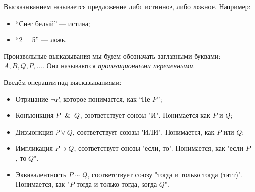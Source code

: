 \begin{definition}
	Высказыванием называется предложение либо истинное, либо ложное. Например:
	\begin{itemize}
		\item ``Снег белый'' --- истина;
		\item ``2  = 5'' --- ложь.
	\end{itemize}

	Произвольные высказывания мы будем обозначать заглавными буквами:
	$A, B, Q, P, \dots$. Они называются \emph{пропозиционными
		переменными}.
\end{definition}

Введём операции над высказываниями:
\begin{itemize}
	\item Отрицание $\neg P$, которое понимается, как ``Не $P$'';
	\item Конъюнкция $P \And Q$, соответствует союзы "И". Понимается
	      как $P$ и $Q$;
	\item  Дизъюнкция $P \vee Q$, соответствует союзы "ИЛИ".
	      Понимается, как $P$ или $Q$;
	\item Импликация $P \supset Q$, соответствует союзы "если, то".
	      Понимается, как "если $P$, то $Q$".
	\item Эквивалентность $P \sim Q$, соответствует союзу "тогда и
	      только тогда (титт)". Понимается, как "$P$ тогда и только тогда,
	      когда $Q$".
\end{itemize}
